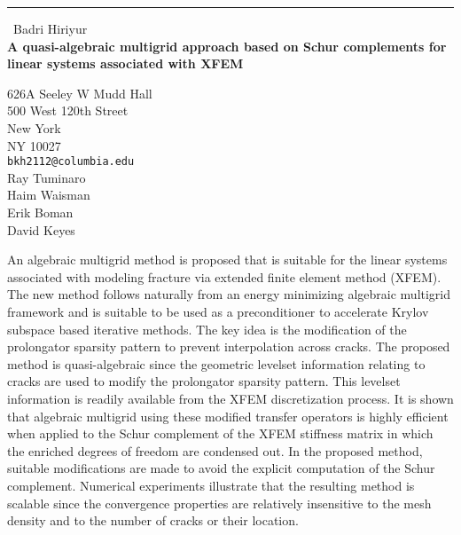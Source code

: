 \documentclass{report}
\begin{document}
\begin{center}
\rule{6in}{1pt} \
{\large Badri Hiriyur \\
{\bf A quasi-algebraic multigrid approach based on Schur complements for linear systems associated with XFEM}}

626A Seeley W Mudd Hall \\ 500 West 120th Street \\ New York \\ NY 10027
\\
{\tt bkh2112@columbia.edu}\\
Ray Tuminaro\\
Haim Waisman\\
Erik Boman\\
David Keyes\end{center}

An algebraic multigrid method is proposed that is suitable for the linear
systems associated with modeling fracture via extended finite element
method (XFEM). The new method follows naturally from an energy minimizing
algebraic multigrid framework and is suitable to be used as a
preconditioner to accelerate Krylov subspace based iterative methods. The
key idea is the modification of the prolongator sparsity pattern to
prevent interpolation across cracks. The proposed method is
quasi-algebraic since the geometric levelset information relating to
cracks are used to modify the prolongator sparsity pattern. This levelset
information is readily available from the XFEM discretization process. It
is shown that algebraic multigrid using these modified transfer operators
is highly efficient when applied to the Schur complement of the XFEM
stiffness matrix in which the enriched degrees of freedom are condensed
out. In the proposed method, suitable modifications are made to avoid the
explicit computation of the Schur complement. Numerical experiments
illustrate that the resulting method is scalable since the convergence
properties are relatively insensitive to the mesh density and to the
number of cracks or their location.
\end{document}

